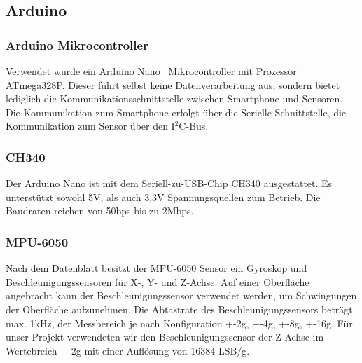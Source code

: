 \subsection*{Arduino}
\label{sec:Arduino}

\subsubsection*{Arduino Mikrocontroller}
Verwendet wurde ein \glqq Arduino Nano\grqq~  Mikrocontroller mit Prozessor ATmega328P. Dieser führt selbst keine Datenverarbeitung aus, sondern bietet lediglich die Kommunikationsschnittstelle zwischen Smartphone und Sensoren. Die Kommunikation zum Smartphone erfolgt über die Serielle Schnittstelle, die Kommunikation zum Sensor über den I$^2$C-Bus. 


\subsubsection*{CH340}
Der Arduino Nano ist mit dem  Seriell-zu-USB-Chip CH340 ausgestattet.
Es unterstützt sowohl 5V, als auch 3.3V Spannungsquellen zum Betrieb.
Die Baudraten reichen von 50bps bis zu 2Mbps.


\subsubsection*{MPU-6050}
Nach dem Datenblatt \cite{MPU6050} besitzt der MPU-6050 Sensor ein Gyroskop und Beschleunigungssensoren für X-, Y- und Z-Achse.
Auf einer Oberfläche angebracht kann der Beschleunigungssensor verwendet werden, um Schwingungen der Oberfläche aufzunehmen.
Die Abtastrate des Beschleunigungssensors beträgt max. 1kHz, der Messbereich je nach Konfiguration +-2g, +-4g, +-8g, +-16g.
Für unser Projekt verwendeten wir den Beschleunigungssensor der Z-Achse im Wertebreich +-2g mit einer Auflösung von 16384 LSB/g.
